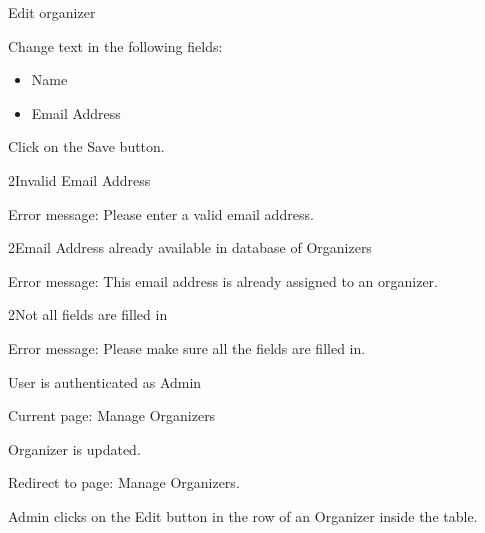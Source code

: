 
\begin{uc}{Edit organizer}


    \begin{uc-mss}
    \item Change text in the following fields:
        \begin{itemize}
            \item Name
            \item Email Address
            \end{itemize}
    \item Click on the Save button.
    \end{uc-mss}

    \begin{uc-ext}

        \begin{uc-fail}{2}{Invalid Email Address}
        \item Error message: Please enter a valid email address.
        \end{uc-fail}

        \begin{uc-fail}{2}{Email Address already available in database of Organizers }
        \item Error message: This email address is already assigned to an organizer.
        \end{uc-fail}

        \begin{uc-fail}{2}{Not all fields are filled in}
        \item Error message: Please make sure all the fields are filled in.
        \end{uc-fail}

    \end{uc-ext}

    \begin{uc-pre}
    \item User is authenticated as Admin
    \item Current page: Manage Organizers
    \end{uc-pre}

    \begin{uc-post}
    \item Organizer is updated.
    \item Redirect to page: Manage Organizers.
    \end{uc-post}

    \begin{uc-trig}
        Admin clicks on the Edit button in the row of an Organizer inside the
        table.
    \end{uc-trig}

\end{uc}
